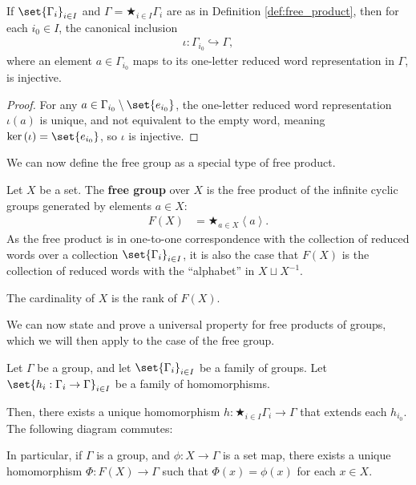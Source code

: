 \begin{corollary}
  If $\set{\Gamma_i}_{i\in I}$ and $\Gamma = \bigstar_{i\in I}\Gamma_i$ are as in Definition \ref{def:free_product}, then for each $i_0\in I$, the canonical inclusion
  \begin{align*}
    \iota: \Gamma_{i_0}\hookrightarrow \Gamma,
  \end{align*}
  where an element $a\in \Gamma_{i_0}$ maps to its one-letter reduced word representation in $\Gamma$, is injective.
\end{corollary}
\begin{proof}
  For any $a\in \Gamma_{i_0}\setminus \set{e_{i_0}}$, the one-letter reduced word representation $\iota(a)$ is unique, and not equivalent to the empty word, meaning $\ker\left(\iota\right) = \set{e_{i_0}}$, so $\iota$ is injective.
\end{proof}
We can now define the free group as a special type of free product.
\begin{definition}\label{def:free_group_as_product}
  Let $X$ be a set. The \textbf{free group} over $X$ is the free product of the infinite cyclic groups generated by elements $a\in X$:
  \begin{align*}
    F(X) &= \bigstar_{a\in X}\left\langle a \right\rangle.
  \end{align*}
  As the free product is in one-to-one correspondence with the collection of reduced words over a collection $\set{\Gamma_i}_{i\in I}$, it is also the case that $F(X)$ is the collection of reduced words with the ``alphabet'' in $X\sqcup X^{-1}$.\newline

  The cardinality of $X$ is the rank of $F(X)$.
\end{definition}
We can now state and prove a universal property for free products of groups, which we will then apply to the case of the free group.
\begin{theorem}
  Let $\Gamma$ be a group, and let $\set{\Gamma_{i}}_{i\in I}$ be a family of groups. Let $\set{h_i: \Gamma_i\rightarrow \Gamma}_{i\in I}$ be a family of homomorphisms.\newline

  Then, there exists a unique homomorphism $h: \bigstar_{i\in I}\Gamma_i \rightarrow \Gamma$ that extends each $h_{i_{0}}$. The following diagram commutes:
  \begin{center}
  \end{center}
  In particular, if $\Gamma$ is a group, and $\phi: X\rightarrow \Gamma$ is a set map, there exists a unique homomorphism $\Phi: F(X)\rightarrow \Gamma$ such that $\Phi(x) = \phi(x)$ for each $x\in X$.
\end{theorem}
